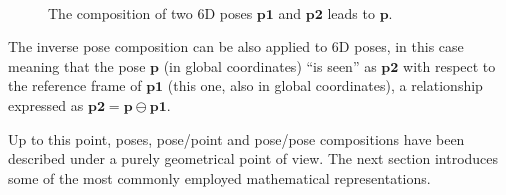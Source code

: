 \documentclass[a4paper,10pt]{report}
\begin{document}
\begin{figure}
\centering
{}
 \\

\caption{The composition of two 6D poses $\mathbf{p1}$ and $\mathbf{p2}$ leads to $\mathbf{p}$.}
\label{fig:comp_2poses}
\end{figure}

The inverse pose composition can be also applied to 6D poses, in this case meaning that
the pose $\mathbf{p}$ (in global coordinates) ``is seen'' as $\mathbf{p2}$ with respect
to the reference frame of $\mathbf{p1}$ (this one, also in global coordinates), a 
relationship expressed as $\mathbf{p2} = \mathbf{p} \ominus \mathbf{p1}$.


Up to this point, poses, pose/point and pose/pose compositions have been described 
under a purely geometrical point of view. 
The next section introduces some of the 
most commonly employed mathematical representations.
\end{document}
